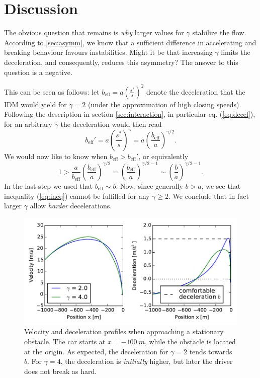 \section{Discussion}
The obvious question that remains is \emph{why} larger values for $\gamma$ stabilize the flow. According to \ref{sec:asymm}, we know that a sufficient difference in accelerating and breaking behaviour favours instabilities. Might it be that increasing $\gamma$ limits the deceleration, and consequently, reduces this asymmetry? The answer to this question is a negative. 

This can be seen as follows: let $b_\mathrm{eff} = a\left(\frac{s^*}{s}\right)^2$ denote the deceleration that the IDM would yield for $\gamma=2$ (under the approximation of high closing speeds). 
Following the description in section \ref{sec:interaction}, in particular eq. (\ref{eq:decel}), for an arbitrary $\gamma$ the deceleration would then read
\begin{equation}
    b_\mathrm{eff}' = a\left(\frac{s^*}{s}\right)^\gamma = a \left(\frac{b_\mathrm{eff}}{a}\right)^{\gamma/2}.
\end{equation}
We would now like to know when $b_\mathrm{eff}>b_\mathrm{eff}'$, or equivalently
\begin{equation}
1>\frac{a}{b_\mathrm{eff}} \left(\frac{b_\mathrm{eff}}{a}\right)^{\gamma/2} = \left(\frac{b_\mathrm{eff}}{a}\right)^{\gamma/2-1}\sim\left(\frac{b}{a}\right)^{\gamma/2-1}.
\label{eq:ineq}
\end{equation}
In the last step we used that $b_\mathrm{eff}\sim b$. Now, since generally $b>a$, we see that inequality (\ref{eq:ineq}) cannot be fulfilled for any $\gamma\ge 2$. We conclude that in fact larger $\gamma$ allow \emph{harder} decelerations.

\begin{figure}
    \centering
    \includegraphics[width=5in]{../img/vel_profile.pdf}
    \caption{Velocity and deceleration profiles when approaching a stationary obstacle. The car starts at $x=\SI{-100}{m}$, while the obstacle is located at the origin. As expected, the deceleration for $\gamma=2$ tends towards $b$. For $\gamma=4$, the deceleration is \emph{initially} higher, but later the driver does not break as hard.}
    \label{fig:vel_profile}
\end{figure}

